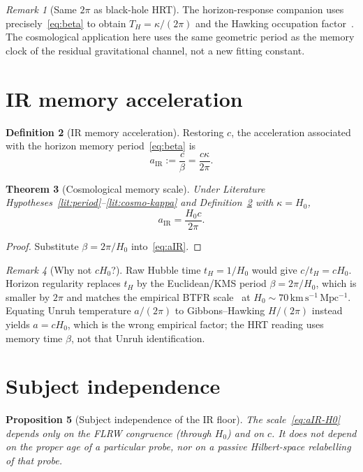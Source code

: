 \documentclass[11pt]{article}
\newtheorem{theorem}{Theorem}[section]
\newtheorem{proposition}[theorem]{Proposition}
\theoremstyle{definition}
\newtheorem{definition}[theorem]{Definition}
\theoremstyle{remark}
\newtheorem{remark}[theorem]{Remark}
\begin{document}
\begin{remark}[Same $2\pi$ as black-hole HRT]
The horizon-response companion uses precisely~\eqref{eq:beta} to obtain
$T_H=\kappa/(2\pi)$ and the Hawking occupation factor~\cite{boyd2026horizon}.
The cosmological application here uses the same geometric period as the memory clock
of the residual gravitational channel, not a new fitting constant.
\end{remark}

\section{IR memory acceleration}
\label{sec:aIR}
\begin{definition}[IR memory acceleration]
\label{def:aIR}
Restoring $c$, the acceleration associated with the horizon memory period~\eqref{eq:beta} is
\begin{equation}
\label{eq:aIR}
a_{\mathrm{IR}}:=\frac{c}{\beta}=\frac{c\kappa}{2\pi}.
\end{equation}
\end{definition}

\begin{theorem}[Cosmological memory scale]
\label{thm:aIR}
Under Literature Hypotheses~\ref{lit:period}--\ref{lit:cosmo-kappa} and Definition~\ref{def:aIR}
with $\kappa=H_0$,
\begin{equation}
\label{eq:aIR-H0}
\boxed{a_{\mathrm{IR}}=\frac{H_0c}{2\pi}.}
\end{equation}
\end{theorem}

\begin{proof}
Substitute $\beta=2\pi/H_0$ into~\eqref{eq:aIR}.
\end{proof}

\begin{remark}[Why not $cH_0$?]
Raw Hubble time $t_H=1/H_0$ would give $c/t_H=cH_0$.
Horizon regularity replaces $t_H$ by the Euclidean/KMS period $\beta=2\pi/H_0$, which is
smaller by $2\pi$ and matches the empirical BTFR scale~\cite{mcgaugh2012,lelli2016}
at $H_0\sim70\,\mathrm{km\,s^{-1}\,Mpc^{-1}}$.
Equating Unruh temperature $a/(2\pi)$ to Gibbons--Hawking $H/(2\pi)$ instead yields
$a=cH_0$, which is the wrong empirical factor; the HRT reading uses memory time $\beta$,
not that Unruh identification.
\end{remark}

\section{Subject independence}
\label{sec:subject}
\begin{proposition}[Subject independence of the IR floor]
\label{prop:subject}
The scale~\eqref{eq:aIR-H0} depends only on the FLRW congruence (through $H_0$) and on $c$.
It does not depend on the proper age of a particular probe, nor on a passive Hilbert-space
relabelling of that probe.
\end{proposition}
\end{document}
